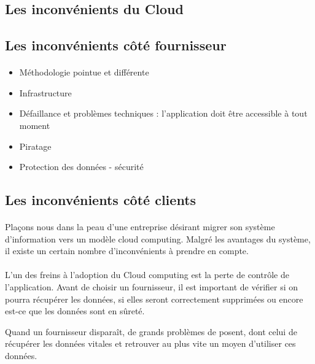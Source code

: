 \documentclass[a4paper,12pt]{report}
\begin{document}
\begin{onehalfspace}
	\section{Les inconvénients du Cloud}
	
	\subsection{Les inconvénients côté fournisseur}

	\paragraph*{}
	\begin{itemize}
		\item Méthodologie pointue et différente
		\item Infrastructure
		\item Défaillance et problèmes techniques : l’application doit être accessible à tout moment
		\item Piratage
		\item Protection des données - sécurité
	\end{itemize}
	
	\subsection{Les inconvénients côté clients}
	

	\paragraph*{}	
	Plaçons nous dans la peau d'une entreprise désirant migrer son système d'information vers un modèle cloud computing. Malgré les avantages du système, il existe un certain nombre d'inconvénients à prendre en compte.
	
	\paragraph*{}
	L'un des freins à l'adoption du Cloud computing est	la perte de contrôle de l'application. Avant de choisir un fournisseur, il est important de vérifier si on pourra récupérer les données, si elles seront correctement supprimées ou encore est-ce que les données sont en sûreté.
	
	Quand un fournisseur disparaît, de grands problèmes de posent, dont celui de récupérer les données vitales et retrouver au plus vite un moyen d'utiliser ces données.
		 

\end{onehalfspace}
\end{document}
